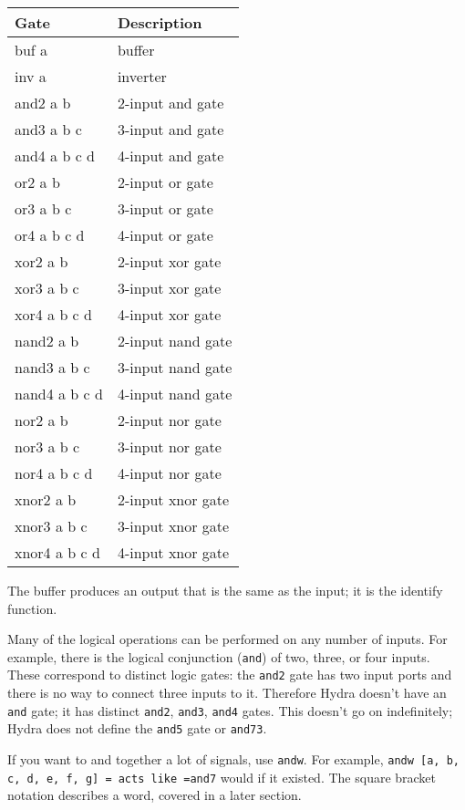 \documentclass[11pt]{article}
\begin{document}
\begin{center}
\begin{tabular}{ll}
Gate & Description\\[0pt]
\hline
buf a & buffer\\[0pt]
inv a & inverter\\[0pt]
and2 a b & 2-input and gate\\[0pt]
and3 a b c & 3-input and gate\\[0pt]
and4 a b c d & 4-input and gate\\[0pt]
or2 a b & 2-input or gate\\[0pt]
or3 a b c & 3-input or gate\\[0pt]
or4 a b c d & 4-input or gate\\[0pt]
xor2 a b & 2-input xor gate\\[0pt]
xor3 a b c & 3-input xor gate\\[0pt]
xor4 a b c d & 4-input xor gate\\[0pt]
nand2 a b & 2-input nand gate\\[0pt]
nand3 a b c & 3-input nand gate\\[0pt]
nand4 a b c d & 4-input nand gate\\[0pt]
nor2 a b & 2-input nor gate\\[0pt]
nor3 a b c & 3-input nor gate\\[0pt]
nor4 a b c d & 4-input nor gate\\[0pt]
xnor2 a b & 2-input xnor gate\\[0pt]
xnor3 a b c & 3-input xnor gate\\[0pt]
xnor4 a b c d & 4-input xnor gate\\[0pt]
\end{tabular}
\end{center}

The buffer produces an output that is the same as the input; it is the
identify function.

Many of the logical operations can be performed on any number of
inputs.  For example, there is the logical conjunction (\texttt{and}) of two,
three, or four inputs.  These correspond to distinct logic gates: the
\texttt{and2} gate has two input ports and there is no way to connect three
inputs to it.  Therefore Hydra doesn't have an \texttt{and} gate; it has
distinct \texttt{and2}, \texttt{and3}, \texttt{and4} gates.  This doesn't go on
indefinitely; Hydra does not define the \texttt{and5} gate or  \texttt{and73}.

If you want to and together a lot of signals, use \texttt{andw}.  For
example, \texttt{andw [a, b, c, d, e, f, g] = acts like =and7} would if it
existed.  The square bracket notation describes a word, covered in a
later section.
\end{document}
